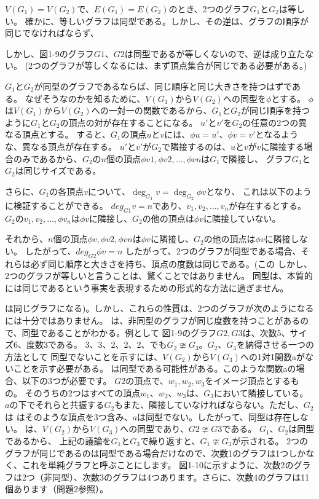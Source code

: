 
$V(G_1)=V(G_2)$で、$E(G_1)=E(G_2)$のとき、2つのグラフ$G_1$と$G_2$は等しい。
確かに、等しいグラフは同型である。しかし、その逆は、グラフの順序が同じでなければならず、


しかし、図1-9のグラフ$G1、G2$は同型であるが等しくないので、逆は成り立たない。
(2つのグラフが等しくなるには、まず頂点集合が同じである必要がある。)

$G_1$と$G_2$が同型のグラフであるならば、同じ順序と同じ大きさを持つはずである。
なぜそうなのかを知るために、$V(G_1)$から$V(G_2)$への同型を$\phi$とする。
$\phi$は$V(G_1)$から$V(G_2)$への一対一の関数であるから、$G_1$と$G_2$が同じ順序を持つように$G_1$と$G_2$の頂点の対が存在することになる。
$u'$と$v'$を$G_2$の任意の2つの異なる頂点とする。
すると、$G_1$の頂点$u$と$v$には、$\phi u = u'、\phi v = v'$となるような、異なる頂点が存在する。
$u'$と$v'$が$G_2$で隣接するのは、$u$と$v$が$v$に隣接する場合のみであるから、$G_2$の$n$個の頂点$\phi v1, \phi v2, \ldots, \phi vn$は$G_1$で隣接し、
グラフ$G_1$と$G_2$は同じサイズである。

さらに、$G_1$の各頂点$v$について、$\deg_{G_1} v = \deg_{G_2} \phi v$となり、
これは以下のように検証することができる。
$deg_{G1} v = n$であり、$v_1, v_2, \ldots, v_n$が存在するとする。
$G_2$の$v_1, v_2, \ldots, \phi v_n$は$\phi v$に隣接し、$G_2$の他の頂点は$\phi v$に隣接していない。

それから、$n$個の頂点$\phi v, \phi v2, \phi vn$は$\phi v$に隣接し、$G_2$の他の頂点は$\phi v$に隣接しない。
したがって、$deg_{G2} \phi v = n$ したがって、2つのグラフが同型である場合、それらは必ず同じ順序と大きさを持ち、頂点の度数は同じである。(この
しかし、2つのグラフが等しいと言うことは、驚くことではありません。
同型は、本質的には同じであるという事実を表現するための形式的な方法に過ぎません。


は同じグラフになる)。しかし、これらの性質は、2つのグラフが次のようになるには十分ではありません。
は、非同型のグラフが同じ度数を持つことがあるので、同型であることがわかる。例として
図1-9のグラフ$G2, G3$は、次数5、サイズ6、度数3である。
3、3、2、2、2、でも$G_2\ncong G_3$。$G_2$、$G_3$を納得させる一つの方法として
同型でないことを示すには、$V(G_2)$から$V(G_3)$への1対1関数aがないことを示す必要がある。
は同型である可能性がある。このような関数aの場合、以下の3つが必要です。
$G2$の頂点で、$w_1, w_2, w_3$をイメージ頂点とするもの。
そのうちの2つはすべての頂点$w_1、w_2、w_3$は、$G_3$において隣接している。
$a$の下でそれらと共振する$G_2$もまた、隣接していなければならない。ただし、$G_2$ は
はそのような頂点を3つ含み、$a$は同型でない。したがって、同型は存在しない。
は、$V(G_2)$から$V(G_3)$への同型であり、$G2\ncong G3$である。
$G_1、G_2$は同型であるから、
上記の議論を$G_1$と$G_3$で繰り返すと、$G_1 \ncong  G_3$が示される。
2つのグラフが同じであるのは同型である場合だけなので、次数1のグラフは1つしかなく、これを単純グラフと呼ぶことにします。
図1-10に示すように、次数2のグラフは2つ（非同型）、次数3のグラフは4つあります。さらに、次数4のグラフは11個あります（問題2参照）。